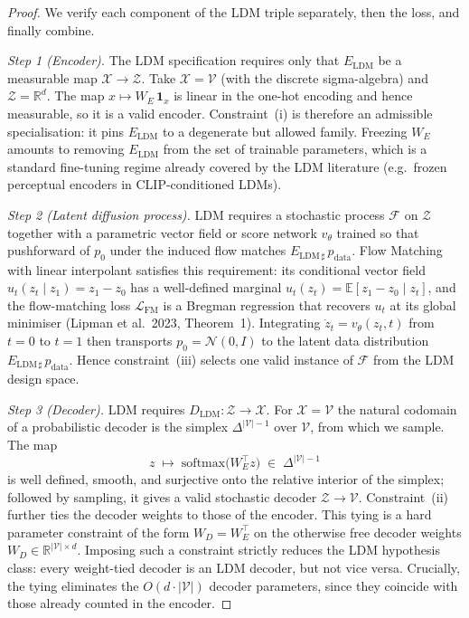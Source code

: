 \documentclass[11pt]{article}
\begin{document}
\begin{proof}
We verify each component of the LDM triple separately, then the loss, and
finally combine.

\smallskip
\noindent\emph{Step 1 (Encoder).}
The LDM specification requires only that $E_{\mathrm{LDM}}$ be a measurable
map $\mathcal{X}\to\mathcal{Z}$. Take $\mathcal{X}=\mathcal{V}$ (with the
discrete sigma-algebra) and $\mathcal{Z}=\mathbb{R}^{d}$. The map
$x\mapsto W_{E}\,\mathbf{1}_{x}$ is linear in the one-hot encoding and
hence measurable, so it is a valid encoder. Constraint~(i) is therefore an
admissible specialisation: it pins $E_{\mathrm{LDM}}$ to a degenerate but
allowed family. Freezing $W_{E}$ amounts to removing $E_{\mathrm{LDM}}$ from
the set of trainable parameters, which is a standard fine-tuning regime
already covered by the LDM literature (e.g.\ frozen perceptual encoders in
CLIP-conditioned LDMs).

\smallskip
\noindent\emph{Step 2 (Latent diffusion process).}
LDM requires a stochastic process $\mathcal{F}$ on $\mathcal{Z}$ together
with a parametric vector field or score network $v_{\theta}$ trained so
that pushforward of $p_{0}$ under the induced flow matches
$E_{\mathrm{LDM}\,\sharp}\,p_{\mathrm{data}}$. Flow Matching with linear
interpolant satisfies this requirement: its conditional vector field
$u_{t}(z_{t}\mid z_{1}) = z_{1}-z_{0}$ has a well-defined marginal
$u_{t}(z_{t}) = \mathbb{E}[z_{1}-z_{0}\mid z_{t}]$, and the flow-matching
loss $\mathcal{L}_{\mathrm{FM}}$ is a Bregman regression that recovers
$u_{t}$ at its global minimiser (Lipman et al.\ 2023, Theorem~1).
Integrating $\dot z_{t} = v_{\theta}(z_{t},t)$ from $t=0$ to $t=1$ then
transports $p_{0}=\mathcal{N}(0,I)$ to the latent data distribution
$E_{\mathrm{LDM}\,\sharp}\,p_{\mathrm{data}}$. Hence constraint~(iii)
selects one valid instance of $\mathcal{F}$ from the LDM design space.

\smallskip
\noindent\emph{Step 3 (Decoder).}
LDM requires $D_{\mathrm{LDM}}\colon\mathcal{Z}\to\mathcal{X}$. For
$\mathcal{X}=\mathcal{V}$ the natural codomain of a probabilistic decoder is
the simplex $\Delta^{|\mathcal{V}|-1}$ over $\mathcal{V}$, from which we
sample. The map
\[
  z \;\longmapsto\; \mathrm{softmax}\bigl(W_{E}^{\top} z\bigr)
  \;\in\; \Delta^{|\mathcal{V}|-1}
\]
is well defined, smooth, and surjective onto the relative interior of the
simplex; followed by sampling, it gives a valid stochastic decoder
$\mathcal{Z}\to\mathcal{V}$. Constraint~(ii) further ties the decoder
weights to those of the encoder. This tying is a hard parameter constraint
of the form $W_{D} = W_{E}^{\top}$ on the otherwise free decoder weights
$W_{D}\in\mathbb{R}^{|\mathcal{V}|\times d}$. Imposing such a constraint
strictly reduces the LDM hypothesis class: every weight-tied decoder is an
LDM decoder, but not vice versa. Crucially, the tying eliminates the
$O(d\cdot|\mathcal{V}|)$ decoder parameters, since they coincide with
those already counted in the encoder.


\end{proof}
\end{document}

